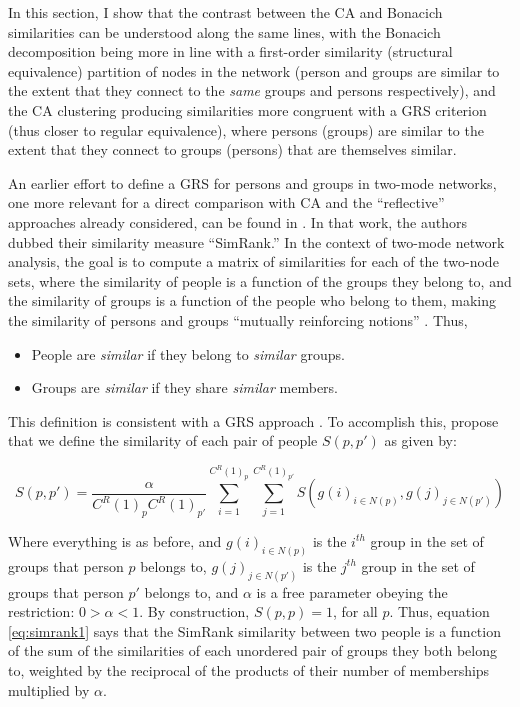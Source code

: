 \documentclass[a4paper,fleqn]{cas-sc}
\begin{document}
In this section, I show that the contrast between the CA and Bonacich similarities can be understood along the same lines, with the Bonacich decomposition being more in line with a first-order similarity (structural equivalence) partition of nodes in the network (person and groups are similar to the extent that they connect to the \textit{same} groups and persons respectively), and the CA clustering producing similarities more congruent with a GRS criterion (thus closer to regular equivalence), where persons (groups) are similar to the extent that they connect to groups (persons) that are themselves similar. 

An earlier effort to define a GRS for persons and groups in two-mode networks, one more relevant for a direct comparison with CA and the ``reflective'' approaches already considered, can be found in \citet{jeh2002simrank}. In that work, the authors dubbed their similarity measure ``SimRank.'' In the context of two-mode network analysis, the goal is to compute a matrix of similarities for each of the two-node sets, where the similarity of people is a function of the groups they belong to, and the similarity of groups is a function of the people who belong to them, making the similarity of persons and groups ``mutually reinforcing notions'' \citep[540]{jeh2002simrank}. Thus,

\begin{itemize}
    \item People are \textit{similar} if they belong to \textit{similar} groups.
    \item Groups are \textit{similar} if they share \textit{similar} members.
\end{itemize}

This definition is consistent with a GRS approach \citep[see][]{kovacs2010generalized, lizardo2024two}. To accomplish this, \citet[540, eq. 2 and eq. 3]{jeh2002simrank} propose that we define the similarity of each pair of people $S(p, p')$  as given by:

\begin{equation}
    S(p, p') = \frac{\alpha}{C^R(1)_pC^R(1)_{p'}}
    \sum_{i = 1}^{C^R(1)_p} \sum_{j = 1}^{C^R(1)_{p'}} 
    S\left(g(i)_{i \in N(p)}, g(j)_{j \in N(p')}\right)
    \label{eq:simrank1}
\end{equation}

Where everything is as before, and $g(i)_{i \in N(p)}$ is the $i^{th}$ group in the set of groups that person $p$ belongs to, $g(j)_{j \in N(p')}$ is the $j^{th}$ group in the set of groups that person $p'$ belongs to, and $\alpha$ is a free parameter obeying the restriction: $0 > \alpha < 1$. By construction, $S(p, p) = 1$, for all $p$. Thus, equation \ref{eq:simrank1} says that the SimRank similarity between two people is a function of the sum of the similarities of each unordered pair of groups they both belong to, weighted by the reciprocal of the products of their number of memberships multiplied by $\alpha$.
\end{document}
